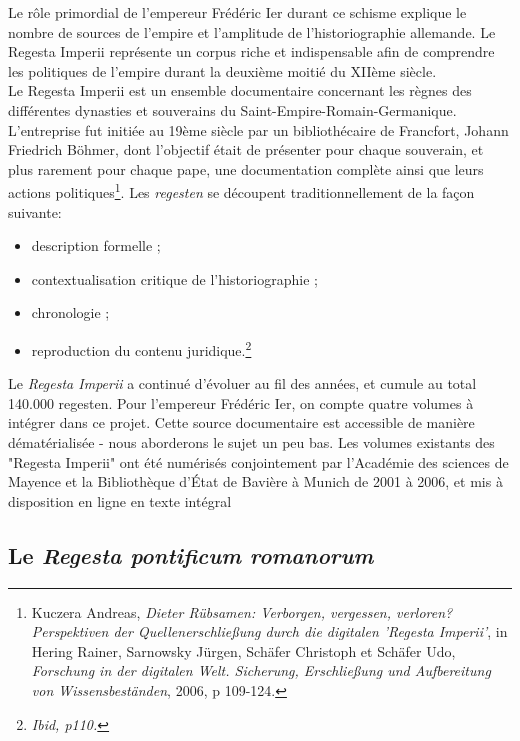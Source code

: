Le rôle primordial de l’empereur Frédéric Ier durant ce schisme explique le nombre de sources de l’empire et l’amplitude de l’historiographie allemande. Le Regesta Imperii représente un corpus riche et indispensable afin de comprendre les politiques de l’empire durant la deuxième moitié du XIIème siècle.\\
Le Regesta Imperii est un ensemble documentaire concernant les règnes des différentes dynasties et souverains du Saint-Empire-Romain-Germanique. L’entreprise fut initiée au 19ème siècle par un bibliothécaire de Francfort, Johann Friedrich Böhmer, dont l’objectif était de présenter pour chaque souverain, et plus rarement pour chaque pape, une documentation complète ainsi que leurs actions politiques\footnote{Kuczera Andreas, \textit{Dieter Rübsamen: Verborgen, vergessen, verloren? Perspektiven der Quellenerschließung durch die digitalen 'Regesta Imperii'}, in Hering Rainer, Sarnowsky Jürgen, Schäfer Christoph et Schäfer Udo, \textit{Forschung in der digitalen Welt. Sicherung, Erschließung und Aufbereitung von Wissensbeständen}, 2006, p 109-124.}. Les \textit{regesten} se découpent traditionnellement de la façon suivante:
\begin{itemize}
    \item description formelle ;
    \item contextualisation critique de l’historiographie ;
    \item chronologie ;
    \item reproduction du contenu juridique.\footnote{\textit{Ibid, p110.}}
    
\end{itemize}
Le \textit{Regesta Imperii} a continué d’évoluer au fil des années, et cumule au total 140.000 regesten. Pour l’empereur Frédéric Ier, on compte quatre volumes à intégrer dans ce projet. Cette source documentaire est accessible de manière dématérialisée - nous aborderons le sujet un peu bas. Les volumes existants des "Regesta Imperii" ont été numérisés conjointement par l'Académie des sciences de Mayence et la Bibliothèque d'État de Bavière à Munich de 2001 à 2006, et mis à disposition en ligne en texte intégral



    \subsection{Le \textit{Regesta pontificum romanorum}}

